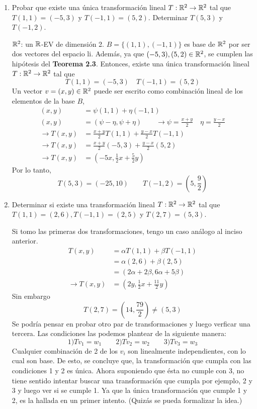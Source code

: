 \item \begin{enumerate}
        \item Probar que existe una única transformación lineal $T:\mathbb{R}^2\to\mathbb{R}^2$ tal que $T(1,1)=(-5,3)$ y $T(-1,1)=(5,2)$. Determinar $T(5,3)$ y $T(-1,2)$.
            \begin{mdframed}[style=s]
                $\mathbb{R}^2$: un $\mathbb{R}$-EV de dimensión 2. $B=\{(1,1),(-1,1)\}$ es base de $\mathbb{R}^2$ por ser dos vectores del espacio li. Además, ya que $(-5,3),(5,2)\in\mathbb{R}^2$, se cumplen las hipótesis del \textbf{Teorema 2.3}. Entonces, existe una única transformación lineal $T:\mathbb{R}^2\to\mathbb{R}^2$ tal que\[T(1,1)=(-5,3)\quad T(-1,1)=(5,2)\]Un vector $v=(x,y)\in\mathbb{R}^2$ puede ser escrito como combinación lineal de los elementos de la base $B$,
                \begin{align*}
                    (x,y)&=\psi(1,1)+\eta(-1,1)\\
                    (x,y)&=(\psi-\eta,\psi+\eta)\qquad\to\psi=\frac{x+y}{2}\quad\eta=\frac{y-x}{2}\\
                    \to T(x,y)&=\frac{x+y}{2} T(1,1)+\frac{y-x}{2} T(-1,1)\\
                    \to T(x,y)&=\frac{x+y}{2}(-5,3)+\frac{y-x}{2}(5,2)\\
                    \to T(x,y)&=\left(-5x,\frac{1}{2}x+\frac{5}{2}y\right)
                \end{align*}
                Por lo tanto,\[T(5,3)=(-25,10)\qquad T(-1,2)=\left(5,\frac{9}{2}\right)\]
            \end{mdframed}
        \item Determinar si existe una transformación lineal $T:\mathbb{R}^2\to\mathbb{R}^2$ tal que $T(1,1)=(2,6),T(-1,1)=(2,5)$ y $T(2,7)=(5,3)$.
            \begin{mdframed}[style=s]
                Si tomo las primeras dos transformaciones, tengo un caso análogo al inciso anterior.
                \begin{align*}
                    T(x,y)&=\alpha T(1,1)+\beta T(-1,1)\\
                    &=\alpha(2,6)+\beta(2,5)\\
                    &=(2\alpha+2\beta,6\alpha+5\beta)\\
                    \to T(x,y)&=\left(2y,\frac{1}{2}x+\frac{11}{2}y\right)
                \end{align*}
                Sin embargo\[T(2,7)=\left(14,\frac{79}{2}\right)\neq (5,3)\]
                Se podría pensar en probar otro par de transformaciones y luego verficar una tercera. Las condiciones las podemos plantear de la siguiente manera:\[1)Tv_1=w_1\qquad 2)Tv_2=w_2\qquad 3)Tv_3=w_3\]
                Cualquier combinación de 2 de los $v_i$ son linealmente independientes, con lo cual son base. De esto, se concluye que, la transformación que cumpla con las condiciones 1 y 2 es única. Ahora suponiendo que ésta no cumple con 3, no tiene sentido intentar buscar una transformación que cumpla por ejemplo, 2 y 3 y luego ver si se cumple 1. Ya que la única transformación que cumple 1 y 2, es la hallada en un primer intento. (Quizás se pueda formalizar la idea.)
            \end{mdframed}
    \end{enumerate}